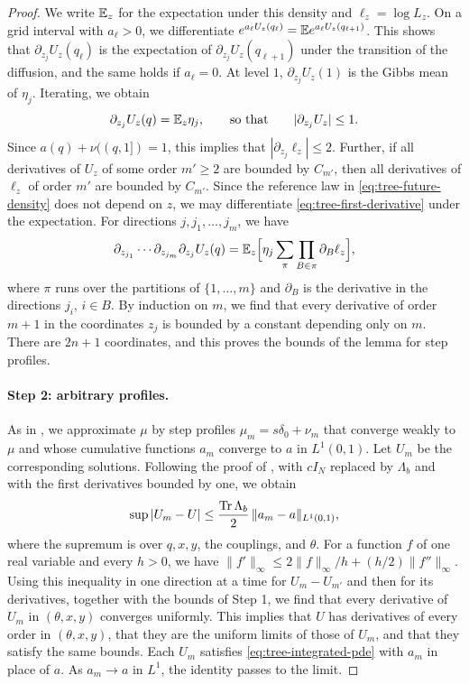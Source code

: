 \begin{proof}
We write $\mathbb E_z$ for the expectation under this density and
$\ell_z=\log L_z$. On a grid interval with $a_\ell>0$, we differentiate
$e^{a_\ell U_z(q_\ell)}=\mathbb E e^{a_\ell U_z(q_{\ell+1})}$. This shows that
$\partial_{z_j}U_z(q_\ell)$ is the expectation of
$\partial_{z_j}U_z(q_{\ell+1})$ under the transition of the diffusion,
and the same holds if $a_\ell=0$. At level $1$, $\partial_{z_j}U_z(1)$ is
the Gibbs mean of $\eta_j$. Iterating, we obtain
\begin{equation}\label{eq:tree-first-derivative}
 \partial_{z_j}U_z(q)=\mathbb E_z\eta_j,\qquad\text{so that}\qquad
 |\partial_{z_j}U_z|\le1 .
\end{equation}
Since $a(q)+\nu((q,1])=1$, this implies that $|\partial_{z_j}\ell_z|\le2$.
Further, if all derivatives of $U_z$ of some order $m'\ge2$ are bounded
by $C_{m'}$, then all derivatives of $\ell_z$ of order $m'$ are bounded
by $C_{m'}$. Since the reference law in \eqref{eq:tree-future-density} does not
depend on $z$, we may differentiate \eqref{eq:tree-first-derivative}
under the expectation. For directions $j,j_1,\ldots,j_m$, we have
\[
 \partial_{z_{j_1}}\cdots\partial_{z_{j_m}}\partial_{z_j}U_z(q)
 =\mathbb E_z\Bigl[\eta_j\sum_\pi\prod_{B\in\pi}\partial_B\ell_z\Bigr],
\]
where $\pi$ runs over the partitions of $\{1,\ldots,m\}$ and $\partial_B$
is the derivative in the directions $j_i$, $i\in B$. By induction on $m$,
we find that every derivative of order $m+1$ in the coordinates $z_j$ is
bounded by a constant depending only on $m$. There are $2n+1$
coordinates, and this proves the bounds of the lemma for step profiles.

\paragraph{Step 2: arbitrary profiles.}
As in \cite[Section~2.6.2]{AL}, we approximate $\mu$ by step profiles
$\mu_m=s\delta_0+\nu_m$ that converge weakly to $\mu$ and whose
cumulative functions $a_m$ converge to $a$ in $L^1(0,1)$. Let $U_m$ be
the corresponding solutions. Following the proof of \cite[(2.19)]{AL}, with $cI_N$
replaced by $\Lambda_b$ and with the first derivatives bounded by one,
we obtain
\[
 \sup|U_m-U|\le\frac{\operatorname{Tr}\Lambda_b}2\,\|a_m-a\|_{L^1(0,1)},
\]
where the supremum is over $q,x,y$, the couplings, and $\theta$. For a
function $f$ of one real variable and every $h>0$, we have
$\|f'\|_\infty\le2\|f\|_\infty/h+(h/2)\|f''\|_\infty$. Using this
inequality in one direction at a time for $U_m-U_{m'}$ and then for its
derivatives, together with the bounds of Step 1, we find that every derivative of $U_m$ in
$(\theta,x,y)$ converges uniformly. This implies that $U$ has
derivatives of every order in $(\theta,x,y)$, that they are the uniform
limits of those of $U_m$, and that they satisfy the same bounds. Each $U_m$
satisfies \eqref{eq:tree-integrated-pde} with $a_m$ in place of $a$. As
$a_m\to a$ in $L^1$, the identity passes to the limit.


\end{proof}
